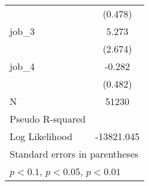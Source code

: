 {\begin{tabular}{l*{1}{c}}
            &     (0.478)         \\
job\_3       &       5.273\sym{**} \\
            &     (2.674)         \\
job\_4       &      -0.282         \\
            &     (0.482)         \\
\hline
N           &       51230         \\
Pseudo R-squared&                     \\
Log Likelihood&  -13821.045         \\
\hline\hline
\multicolumn{2}{l}{\footnotesize Standard errors in parentheses}\\
\multicolumn{2}{l}{\footnotesize \sym{*} \(p<0.1\), \sym{**} \(p<0.05\), \sym{***} \(p<0.01\)}\\
\end{tabular}
}
